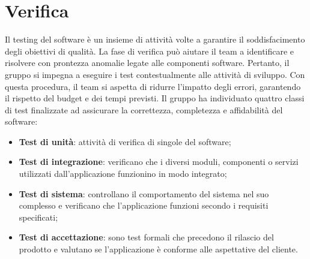 \section{Verifica}

\par Il testing del software è un insieme di attività volte a garantire il soddisfacimento degli obiettivi di qualità. La fase di verifica può aiutare il team a identificare e risolvere con prontezza anomalie legate alle componenti software. Pertanto, il gruppo si impegna a eseguire i test contestualmente alle attività di sviluppo. Con questa procedura, il team si aspetta di ridurre l’impatto degli errori, garantendo il rispetto del budget e dei tempi previsti. Il gruppo ha individuato quattro classi di test finalizzate ad assicurare la correttezza, completezza e affidabilità del software:
\begin{itemize}
  \item \textbf{Test di unità}: attività di verifica di singole  del software;
  \item \textbf{Test di integrazione}: verificano che i diversi moduli, componenti o servizi utilizzati dall'applicazione funzionino in modo integrato;
  \item \textbf{Test di sistema}: controllano il comportamento del sistema nel suo complesso e verificano che l'applicazione funzioni secondo i requisiti specificati;
  \item \textbf{Test di accettazione}: sono test formali che precedono il rilascio del prodotto e valutano se l'applicazione è conforme alle aspettative del cliente.
\end{itemize}





\clearpage
